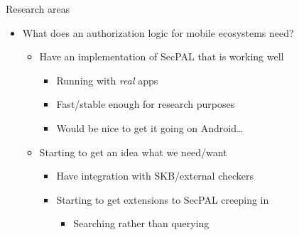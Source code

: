 \documentclass[ignorenonframetext,]{beamer}
\begin{document}
\begin{frame}{Research areas}

\begin{itemize}
\itemsep1pt\parskip0pt
\item
  What does an authorization logic for mobile ecosystems need?

  \begin{itemize}
  \itemsep1pt\parskip0pt
  \item
    Have an implementation of SecPAL that is working well

    \begin{itemize}
    \itemsep1pt\parskip0pt
    \item
      Running with \emph{real} apps
    \item
      Fast/stable enough for research purposes
    \item
      Would be nice to get it going on Android\ldots{}
    \end{itemize}
  \item
    Starting to get an idea what we need/want

    \begin{itemize}
    \itemsep1pt\parskip0pt
    \item
      Have integration with SKB/external checkers
    \item
      Starting to get extensions to SecPAL creeping in

      \begin{itemize}
      \itemsep1pt\parskip0pt
      \item
        Searching rather than querying
      \end{itemize}
    \end{itemize}
  \end{itemize}
\end{itemize}

\end{frame}
\end{document}
